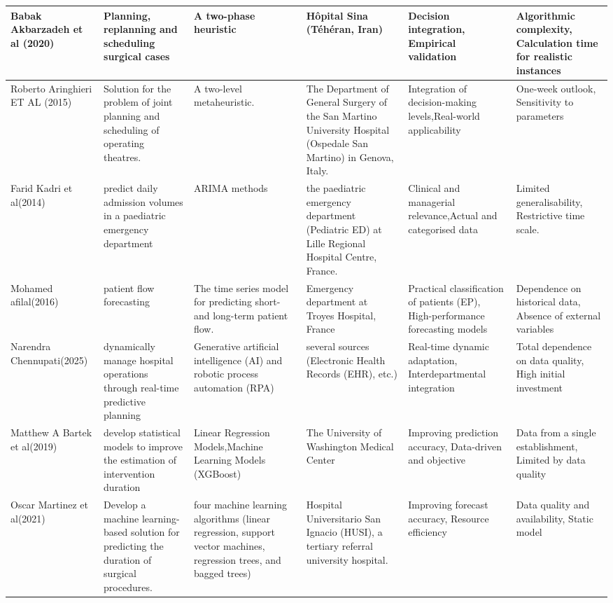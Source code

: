 \documentclass[runningheads]{llncs}
\begin{document}
\begin{landscape}
\begin{longtable}{|p{3cm}|p{3cm}|p{4cm}|p{3cm}|p{3cm}|p{3cm}|}
\hline
\cite{akbarzadeh2020or}  Babak Akbarzadeh et al (2020) &Planning, replanning and scheduling surgical cases  & A two-phase heuristic & Hôpital Sina (Téhéran, Iran)& Decision integration, Empirical validation & Algorithmic complexity, Calculation time for realistic instances \\
\hline
\cite{aringhieri2015metaheuristic} Roberto Aringhieri ET AL (2015) & Solution for the problem of joint planning and scheduling of operating theatres. & A two-level metaheuristic. &The Department of General Surgery of the San Martino University Hospital (Ospedale San Martino) in Genova, Italy.& Integration of decision-making levels,Real-world applicability & One-week outlook, Sensitivity to parameters\\
\hline
 \cite{kadri2014ed} Farid Kadri et al(2014) & predict daily admission volumes in a paediatric emergency department & ARIMA methods &the paediatric emergency department (Pediatric ED) at Lille Regional Hospital Centre, France.& Clinical and managerial relevance,Actual and categorised data & Limited generalisability, Restrictive time scale.\\
\hline
 \cite{afilal2016edflow} Mohamed afilal(2016) &patient flow forecasting &The time series model for predicting short- and long-term patient flow.&Emergency department at Troyes Hospital, France & Practical classification of patients (EP), High-performance forecasting models & Dependence on historical data, Absence of external variables\\
\hline
 \cite{chennupati2025aira} Narendra Chennupati(2025) &dynamically manage hospital operations through
real-time predictive planning & Generative artificial intelligence (AI) and robotic process automation (RPA)& several sources (Electronic Health Records (EHR), etc.) & Real-time dynamic adaptation, Interdepartmental integration & Total dependence on data quality, High initial investment\\
\hline
\cite{bartek2019ml} Matthew A Bartek et al(2019) & develop statistical models to improve the estimation of intervention duration &Linear Regression Models,Machine Learning Models (XGBoost) &The University of Washington Medical Center & Improving prediction accuracy, Data-driven and objective & Data from a single establishment, Limited by data quality\\
\hline
\cite{martinez2021surgical} Oscar Martinez et al(2021) &Develop a machine learning-based solution for predicting the duration of surgical procedures. &four machine learning algorithms (linear regression, support vector machines, regression trees, and bagged trees) & Hospital Universitario San Ignacio (HUSI), a tertiary referral university hospital. & Improving forecast accuracy, Resource efficiency & Data quality and availability, Static model\\

\end{longtable}
\end{landscape}
\end{document}
